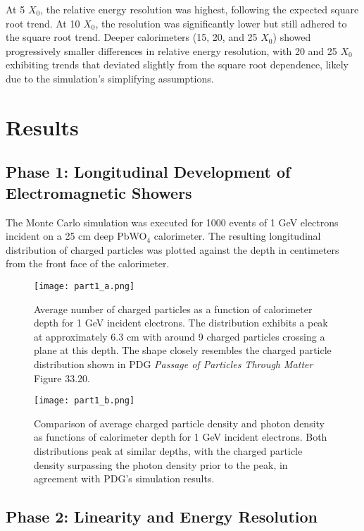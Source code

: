 \documentclass[twocolumn]{aastex631}
\begin{document}
At 5 \(X_0\), the relative energy resolution was highest, following the expected square root trend. At 10 \(X_0\), the resolution was significantly lower but still adhered to the square root trend. Deeper calorimeters (15, 20, and 25 \(X_0\)) showed progressively smaller differences in relative energy resolution, with 20 and 25 \(X_0\) exhibiting trends that deviated slightly from the square root dependence, likely due to the simulation's simplifying assumptions.

\section{Results}\label{sec:results_phase1}

\subsection{Phase 1: Longitudinal Development of Electromagnetic Showers}

The Monte Carlo simulation was executed for 1000 events of 1 GeV electrons incident on a 25 cm deep PbWO\(_4\) calorimeter. The resulting longitudinal distribution of charged particles was plotted against the depth in centimeters from the front face of the calorimeter.

\begin{figure}[htp]
    \centering
    \texttt{[image: part1\_a.png]}
    \caption{Average number of charged particles as a function of calorimeter depth for 1 GeV incident electrons. The distribution exhibits a peak at approximately 6.3 cm with around 9 charged particles crossing a plane at this depth. The shape closely resembles the charged particle distribution shown in PDG \textit{Passage of Particles Through Matter} Figure 33.20.}
    \label{fig:charged_particles_1GeV}
\end{figure}

\begin{figure}[htp]
    \centering
    \texttt{[image: part1\_b.png]}
    \caption{Comparison of average charged particle density and photon density as functions of calorimeter depth for 1 GeV incident electrons. Both distributions peak at similar depths, with the charged particle density surpassing the photon density prior to the peak, in agreement with PDG's simulation results.}
    \label{fig:charged_vs_photons_1GeV}
\end{figure}

\subsection{Phase 2: Linearity and Energy Resolution}
\end{document}
